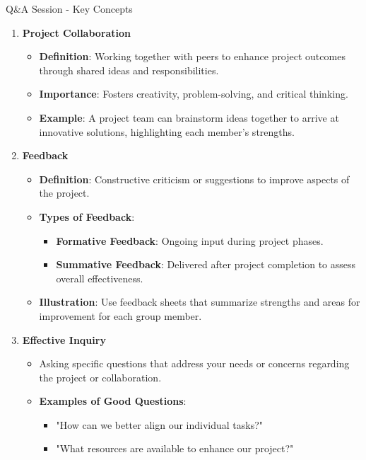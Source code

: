 \documentclass[aspectratio=169]{beamer}
\begin{document}
\begin{frame}[fragile]{Q\&A Session - Key Concepts}
    \begin{enumerate}
        \item \textbf{Project Collaboration}
            \begin{itemize}
                \item \textbf{Definition}: Working together with peers to enhance project outcomes through shared ideas and responsibilities.
                \item \textbf{Importance}: Fosters creativity, problem-solving, and critical thinking.
                \item \textbf{Example}: A project team can brainstorm ideas together to arrive at innovative solutions, highlighting each member’s strengths.
            \end{itemize}
        
        \item \textbf{Feedback}
            \begin{itemize}
                \item \textbf{Definition}: Constructive criticism or suggestions to improve aspects of the project.
                \item \textbf{Types of Feedback}:
                    \begin{itemize}
                        \item \textbf{Formative Feedback}: Ongoing input during project phases.
                        \item \textbf{Summative Feedback}: Delivered after project completion to assess overall effectiveness.
                    \end{itemize}
                \item \textbf{Illustration}: Use feedback sheets that summarize strengths and areas for improvement for each group member.
            \end{itemize}
        
        \item \textbf{Effective Inquiry}
            \begin{itemize}
                \item Asking specific questions that address your needs or concerns regarding the project or collaboration.
                \item \textbf{Examples of Good Questions}:
                    \begin{itemize}
                        \item "How can we better align our individual tasks?"
                        \item "What resources are available to enhance our project?"
                    \end{itemize}
            \end{itemize}
    \end{enumerate}
\end{frame}
\end{document}
